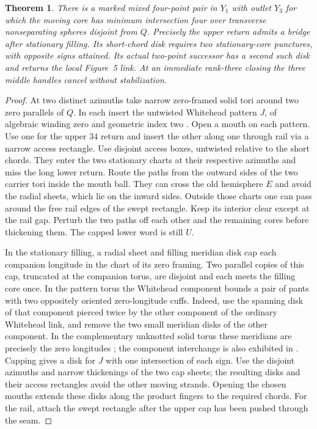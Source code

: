 \documentclass[11pt,letterpaper]{article}
\numberwithin{equation}{section}
\newtheorem{theorem}{Theorem}[section]
\theoremstyle{remark}
\begin{document}
\begin{theorem}\label{thm:whitehead-four}
There is a marked mixed four-point pair in \(Y_1\) with outlet
\(Y_3\) for which the moving core has minimum intersection four
over transverse nonseparating spheres disjoint from \(Q\).
Precisely the upper return admits a
bridge after stationary filling. Its short-chord disk requires two
stationary-core punctures, with opposite signs attained. Its actual
two-point successor has a second such disk and returns the local
Figure~5 link. At an immediate rank-three closing the three middle
handles cancel without stabilization.
\end{theorem}
\begin{proof}
At two distinct azimuths take narrow zero-framed solid tori around
two zero parallels of \(Q\). In each insert the untwisted Whitehead
pattern \(J\), of algebraic winding zero and geometric index two
\cite[Figure 3(a) and \S5]{AndristEtAl2017GeometricIndex}.
Open a mouth on each pattern. Use one for the upper \(34\) return
and insert the other along one through rail via a narrow access
rectangle. Use disjoint access boxes, untwisted relative to the
short chords. They enter the two stationary charts at their
respective azimuths and miss the long lower return. Route the paths from the outward sides of the two carrier tori inside
the mouth ball. They can cross the old hemisphere \(E\) and avoid
the radial sheets, which lie on the inward sides. Outside those
charts one can pass around the free rail edges of the swept rectangle.
Keep its interior clear except at the rail gap. Perturb the two paths
off each other and the remaining cores before thickening them. The capped lower
word is still \(U\).

In the stationary filling, a radial sheet and filling meridian disk
cap each companion longitude in the chart of its zero framing.
Two parallel copies of this cap, truncated at the companion torus,
are disjoint and each meets the filling core once. In the pattern
torus the Whitehead component bounds a pair of pants with two
oppositely oriented zero-longitude cuffs. Indeed, use the spanning
disk of that component pierced twice by the other component of the
ordinary Whitehead link, and remove the two small meridian disks
of the other component. In the complementary unknotted solid torus
these meridians are precisely the zero longitudes
\cite[Example 1 and Figure 2]{Thurston1986ManifoldNorm}; the component interchange is also exhibited in \cite[Figure 4]{HeddenKirk2012Whitehead}.
Capping gives a disk for \(J\) with one intersection of each sign.
Use the disjoint azimuths and narrow thickenings of the two cap
sheets; the resulting disks and their access rectangles avoid the
other moving strands. Opening the chosen mouths extends these
disks along the product fingers to the required chords. For the
rail, attach the swept rectangle after the upper cap has been pushed
through the seam.


\end{proof}
\end{document}
